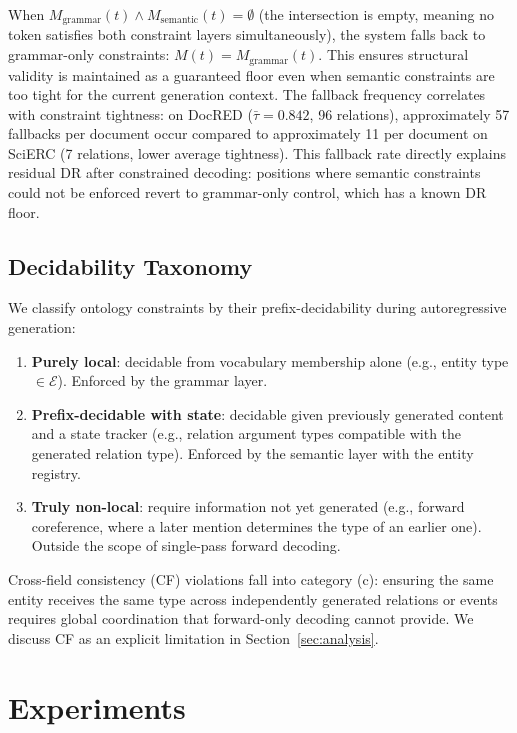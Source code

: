 \documentclass[11pt,a4paper]{article}
\begin{document}
When $M_{\text{grammar}}(t) \wedge M_{\text{semantic}}(t) = \emptyset$ (the intersection is empty, meaning no token satisfies both constraint layers simultaneously), the system falls back to grammar-only constraints: $M(t) = M_{\text{grammar}}(t)$. This ensures structural validity is maintained as a guaranteed floor even when semantic constraints are too tight for the current generation context. The fallback frequency correlates with constraint tightness: on DocRED ($\bar{\tau}=0.842$, 96 relations), approximately 57 fallbacks per document occur compared to approximately 11 per document on SciERC (7 relations, lower average tightness). This fallback rate directly explains residual DR after constrained decoding: positions where semantic constraints could not be enforced revert to grammar-only control, which has a known DR floor.

\subsection{Decidability Taxonomy}
\label{sec:decidability}

We classify ontology constraints by their prefix-decidability during autoregressive generation:

\begin{enumerate}[nosep,label=(\alph*)]
\item \textbf{Purely local}: decidable from vocabulary membership alone (e.g., entity type $\in \mathcal{E}$). Enforced by the grammar layer.
\item \textbf{Prefix-decidable with state}: decidable given previously generated content and a state tracker (e.g., relation argument types compatible with the generated relation type). Enforced by the semantic layer with the entity registry.
\item \textbf{Truly non-local}: require information not yet generated (e.g., forward coreference, where a later mention determines the type of an earlier one). Outside the scope of single-pass forward decoding.
\end{enumerate}

Cross-field consistency (CF) violations fall into category (c): ensuring the same entity receives the same type across independently generated relations or events requires global coordination that forward-only decoding cannot provide. We discuss CF as an explicit limitation in Section~\ref{sec:analysis}.

\section{Experiments}
\label{sec:experiments}
\end{document}
